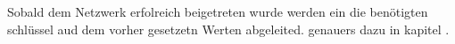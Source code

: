 \documentclass[a4paper,12pt]{article}
\begin{document}
    Sobald dem Netzwerk erfolreich beigetreten wurde werden ein die benötigten schlüssel aud dem vorher gesetzetn Werten abgeleited. genauers dazu in kapitel .
        \newpage
    
    
\end{document}
